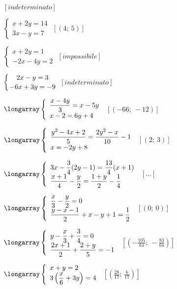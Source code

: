 \begin{esercizio}[\Ast]
\begin{multicols}{2}
\begin{enumeratea}
 \hfill $\left[indeterminato\right]$
\item $\left\{\begin{array}{l}x+2y=14\\3x-y=7\end{array}\right.$
 \hfill $\left[(4;~5)\right]$
\item $\left\{\begin{array}{l}x+2y=1\\-2x-4y=2\end{array}\right.$
 \hfill $\left[impossibile\right]$
\item $\left\{\genfrac{}{}{0pt}{0}{2x-y=3}{-6x+3y=-9}\right.$
 \hfill $\left[indeterminato\right]$
 \item $\longarray\left\{\begin{array}{l}
\dfrac{x-4y}{3}=x-5y\\
x-2=6y+4 \end{array}\right.$
 \hfill $\left[(-66;~-12)\right]$
\item $\longarray\left\{\begin{array}{l}
\dfrac{y^{2}-4x+2}{5}=\dfrac{2y^{2}-x}{10}-1\\
x=-2y+8\end{array}\right.$
 \hfill $\left[(2;~3)\right]$
\item $\longarray\left\{\begin{array}{l}
3x-\dfrac{3}{4}(2y-1)=\dfrac{13}{4}(x+1)\\
\dfrac{x+1}{4}-\dfrac{y}{2}=\dfrac{1+y}{2}-\dfrac{1}{4}\end{array}\right.$
 \hfill $\left[...\right]$
\item $\longarray\left\{\begin{array}{l}
\dfrac{x}{3}-\dfrac{y}{2}=0\\
\dfrac{y-x-1}{2}+x-y+1=\dfrac{1}{2}\end{array}\right.$
 \hfill $\left[(0;~0)\right]$
\item $\longarray\left\{\begin{array}{l}
y-\dfrac{x}{3}+\dfrac{3}{4}=0\\
\dfrac{2x+1}{2}+\dfrac{2+y}{5}=-1
\end{array}\right.$
 \hfill $\left[\left(-{\frac{105}{64}};~-\frac{83}{64}\right)\right]$
\item $\longarray\left\{\begin{array}{l}
x+y=2\\
3\left(\dfrac{x}{6}+3y\right)=4\end{array}\right.$
 \hfill $\left[\left(\frac{28}{17};~\frac{6}{17}\right)\right]$

\end{enumeratea}
\end{multicols}
\end{esercizio}
